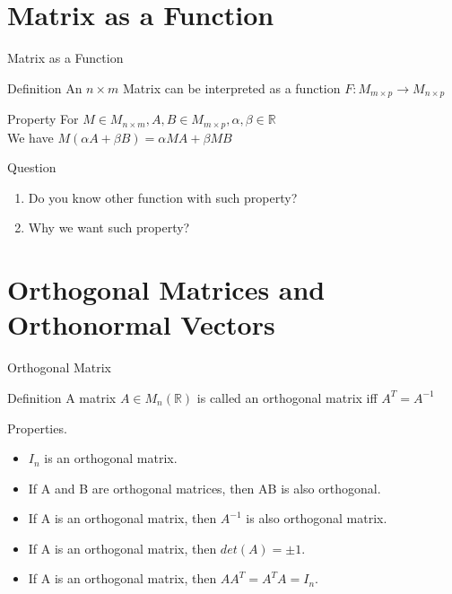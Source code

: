 \documentclass[aspectratio=169, UTF8]{ctexbeamer}
\begin{document}
\section{Matrix as a Function}
\begin{frame}{Matrix as a Function}
    \begin{block}{Definition}
        An $ n \times m$ Matrix can be interpreted as a function $F: M_{m \times p} \to M_{n \times p}$
    \end{block}
    \begin{block}{Property}
        For $M \in M_{n \times m}, A,B \in M_{m \times p}, \alpha , \beta \in \mathbb{R}$ \\
        We have $M(\alpha A + \beta B) = \alpha MA + \beta MB$
    \end{block}
    \begin{block}{Question}
        \begin{enumerate}
            \item Do you know other function with such property?
            \item Why we want such property?
        \end{enumerate}
    \end{block}
\end{frame}
\section{Orthogonal Matrices and Orthonormal Vectors}
\begin{frame}{Orthogonal Matrix}
    \begin{block}{Definition}
        A matrix $A \in M_n(\mathbb{R})$ is called an orthogonal matrix iff $A^T = A^{-1}$
    \end{block}
    \begin{block}{Properties.}
        \begin{itemize}
            \item $I_n$ is an orthogonal matrix.
            \item If A and B are orthogonal matrices, then AB is also orthogonal.
            \item If A is an orthogonal matrix, then $A^{-1}$ is also orthogonal matrix.
            \item If A is an orthogonal matrix, then $det(A)= \pm 1$.
            \item If A is an orthogonal matrix, then $AA^T = A^T A = I_n$.
        \end{itemize}
    \end{block}
\end{frame}
\end{document}
